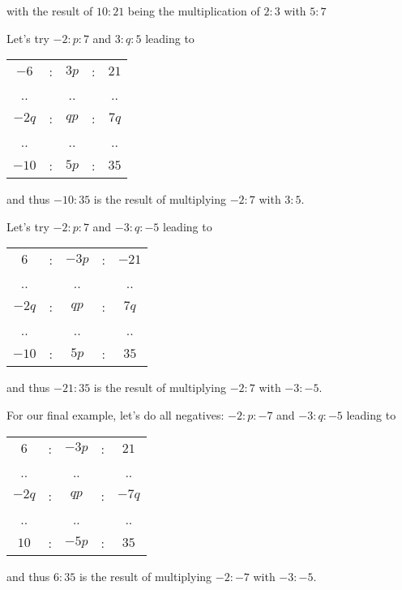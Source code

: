 \documentclass[12pt]{article}
\theoremstyle{remark}
\begin{document}
\begin{enumerate}
    with the result of $10:21$ being the multiplication of $2:3$ with $5:7$
    
    Let's try $-2 : p : 7$ and $3: q : 5$ leading to
    
     \begin{tabular}{ccccc}
        $-6$ &:& $3p$ &:& $21$ \\
        .. & & .. & & .. \\
        $-2q$ &:& $qp$ &:& $7q$\\
        .. & & .. & & .. \\
         $-10$ &:& $5p$&:& $35$
    \end{tabular}
    
    and thus $-10:35$ is the result of multiplying $-2:7$ with $3:5$.

    Let's try $-2 : p : 7$ and $-3: q : -5$ leading to
    
     \begin{tabular}{ccccc}
        $6$ &:& $-3p$ &:& $-21$ \\
        .. & & .. & & .. \\
        $-2q$ &:& $qp$ &:& $7q$\\
        .. & & .. & & .. \\
         $-10$ &:& $5p$&:& $35$
    \end{tabular}
    
    and thus $-21:35$ is the result of multiplying $-2:7$ with $-3:-5$.

    For our final example, let's do all negatives: $-2 : p : -7$ and $-3: q : -5$ leading to
    
     \begin{tabular}{ccccc}
        $6$ &:& $-3p$ &:& $21$ \\
        .. & & .. & & .. \\
        $-2q$ &:& $qp$ &:& $-7q$\\
        .. & & .. & & .. \\
         $10$ &:& $-5p$&:& $35$
    \end{tabular}
    
    and thus $6:35$ is the result of multiplying $-2:-7$ with $-3:-5$.
    

\end{enumerate}
\end{document}
